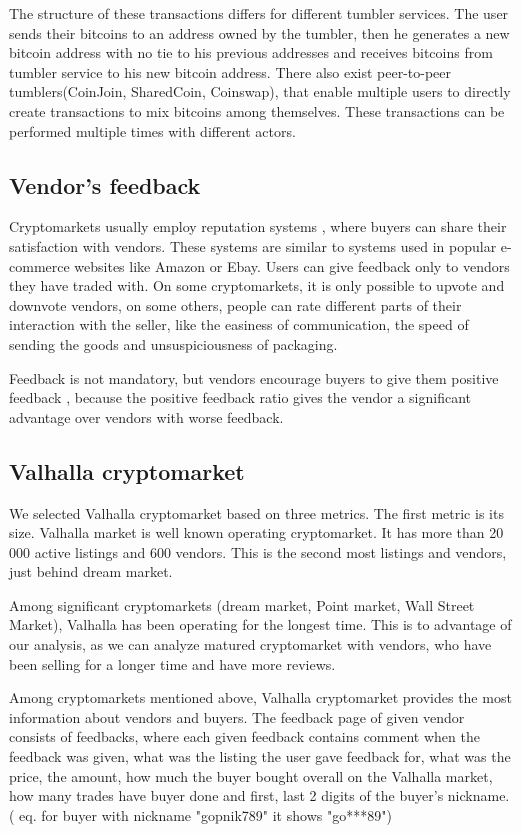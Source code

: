 \documentclass[
  digital, %
  table,   %
  lof,     %
  lot,     %
  oneside
]{fithesis3}
\begin{document}
The structure of these transactions differs for different tumbler services.
The user sends their bitcoins to an address owned by the tumbler,
then he generates a new bitcoin address with no tie to his previous addresses
and receives bitcoins from tumbler service to his new bitcoin address.
 There also exist peer-to-peer tumblers(CoinJoin, SharedCoin, Coinswap),
that enable multiple users to directly create transactions to mix bitcoins among themselves.
These transactions can be performed multiple times with different actors.

\subsection{Vendor's feedback}

Cryptomarkets usually employ reputation systems \parencite{resnick2000reputation},
where buyers can share their satisfaction with vendors.
These systems are similar to systems used in popular e-commerce websites like Amazon or Ebay.
Users can give feedback only to vendors they have traded with.
On some cryptomarkets, it is only possible to upvote and downvote vendors,
on some others, people can rate different parts of their interaction with the seller,
like the easiness of communication,
the speed of sending the goods and unsuspiciousness of packaging.

Feedback is not mandatory, but vendors encourage buyers to give them positive feedback
\parencite{aldridge2014not}\parencite{soska2015measuring}, because the positive feedback
ratio gives the vendor a significant advantage over vendors with worse feedback.

\subsection{Valhalla cryptomarket}

We selected Valhalla cryptomarket based on three metrics.
The first metric is its size. Valhalla market is well known operating cryptomarket.
It has more than 20 000 active listings and 600 vendors.
This is the second most listings and vendors, just behind dream market.

Among significant cryptomarkets (dream market, Point market, Wall Street Market), Valhalla
has been operating for the longest time. This is to advantage of our analysis, as we can analyze matured cryptomarket with vendors, who have been selling for a longer time and have more reviews.

Among cryptomarkets mentioned above,
Valhalla cryptomarket provides the most information about vendors and buyers.
The feedback page of given vendor consists of feedbacks, where
each given feedback contains comment when the feedback was given,
what was the listing the user gave feedback for, what was the price,
the amount, how much the buyer bought overall on the Valhalla market,
how many trades have buyer done and first, last 2 digits of the buyer's nickname. 
( eq. for buyer with nickname "gopnik789" it shows "go***89")
\end{document}
